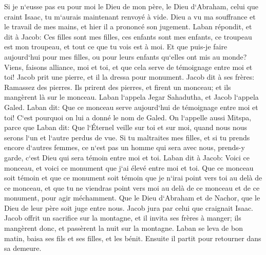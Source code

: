 \verse Si je n`eusse pas eu pour moi le Dieu de mon père, le Dieu d`Abraham, celui que craint Isaac, tu m`aurais maintenant renvoyé à vide. Dieu a vu ma souffrance et le travail de mes mains, et hier il a prononcé son jugement. 
\verse Laban répondit, et dit à Jacob: Ces filles sont mes filles, ces enfants sont mes enfants, ce troupeau est mon troupeau, et tout ce que tu vois est à moi. Et que puis-je faire aujourd`hui pour mes filles, ou pour leurs enfants qu`elles ont mis au monde? 
\verse Viens, faisons alliance, moi et toi, et que cela serve de témoignage entre moi et toi! 
\verse Jacob prit une pierre, et il la dressa pour monument. 
\verse Jacob dit à ses frères: Ramassez des pierres. Ils prirent des pierres, et firent un monceau; et ils mangèrent là sur le monceau. 
\verse Laban l`appela Jegar Sahadutha, et Jacob l`appela Galed. 
\verse Laban dit: Que ce monceau serve aujourd`hui de témoignage entre moi et toi! C`est pourquoi on lui a donné le nom de Galed. 
\verse On l`appelle aussi Mitspa, parce que Laban dit: Que l`Éternel veille sur toi et sur moi, quand nous nous serons l`un et l`autre perdus de vue. 
\verse Si tu maltraites mes filles, et si tu prends encore d`autres femmes, ce n`est pas un homme qui sera avec nous, prends-y garde, c`est Dieu qui sera témoin entre moi et toi. 
\verse Laban dit à Jacob: Voici ce monceau, et voici ce monument que j`ai élevé entre moi et toi. 
\verse Que ce monceau soit témoin et que ce monument soit témoin que je n`irai point vers toi au delà de ce monceau, et que tu ne viendras point vers moi au delà de ce monceau et de ce monument, pour agir méchamment. 
\verse Que le Dieu d`Abraham et de Nachor, que le Dieu de leur père soit juge entre nous. Jacob jura par celui que craignait Isaac. 
\verse Jacob offrit un sacrifice sur la montagne, et il invita ses frères à manger; ils mangèrent donc, et passèrent la nuit sur la montagne. 
\verse Laban se leva de bon matin, baisa ses fils et ses filles, et les bénit. Ensuite il partit pour retourner dans sa demeure. 

